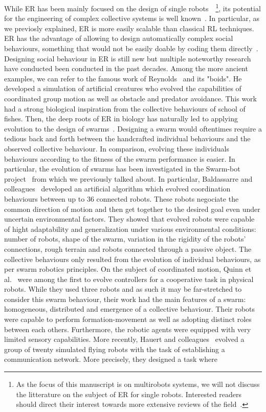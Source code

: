     While ER has been mainly focused on the design of single robots~\parencite{Doncieux2015a}~\footnote{As the focus of this manuscript is on multirobots systems, we will not discuss the litterature on the subject of ER for single robots. Interested readers should direct their interest towards more extensive reviews of the field~\parencite{Floreano2008, Bongard2013a, Trianni2014, Doncieux2015a}.}, its potential for the engineering of complex collective systems is well known~\parencite{Baldassarre2003}. In particular, as we previosly explained, ER is more easily scalable than classical RL techniques. ER has the advantage of allowing to design automatically complex social behaviours, something that would not be easily doable by coding them directly~\parencite{Baldassarre2003}. Designing social behaviour in ER is still new but multiple noteworthy research have conducted been conducted in the past decades. Among the more ancient examples, we can refer to the famous work of Reynolds~\parencite{Reynolds1992} and its "boids". He developed a simulation of artificial creatures who evolved the capabilities of coordinated group motion as well as obstacle and predator avoidance. This work had a strong biological inspiration from the collective behaviours of school of fishes. Then, the deep roots of ER in biology has naturally led to applying evolution to the design of swarms~\parencite{Brambilla2012, Francesca2016}. Designing a swarm would oftentimes require a tedious back and forth between the handcrafted individual behaviours and the observed collective behaviour. In comparison, evolving these individuals behaviours according to the fitness of the swarm performance is easier. In particular, the evolution of swarms has been investigated in the Swarm-bot project~\parencite{Mondada2005} from which we previously talked about. In particular, Baldassarre and colleagues~\parencite{Baldassarre2007} developed an artificial algorithm which evolved coordination behaviours between up to $36$ connected robots. These robots negociate the common direction of motion and then get together to the desired goal even under uncertain environmental factors. They showed that evolved robots were capable of hight adaptability and generalization under various environmental conditions: number of robots, shape of the swarm, variation in the rigidity of the robots' connections, rough terrain and robots connected through a passive object. The collective behaviours only resulted from the evolution of individual behaviours, as per swarm robotics principles. On the subject of coordinated motion, Quinn et al.~\parencite{Quinn2003} were among the first to evolve controllers for a cooperative task in physical robots. While they used three robots and as such it may be far-stretched to consider this swarm behaviour, their work had the main features of a swarm: homogeneous, distributed and emergence of a collective behaviour. Their robots were capable to perform formation-movement as well as adopting distinct roles between each others. Furthermore, the robotic agents were equipped with very limited sensory capabilities. More recently, Hauert and colleagues~\parencite{Hauert2014} evolved a group of twenty simulated flying robots with the task of establishing a communication network. More precisely, they designed a task where 